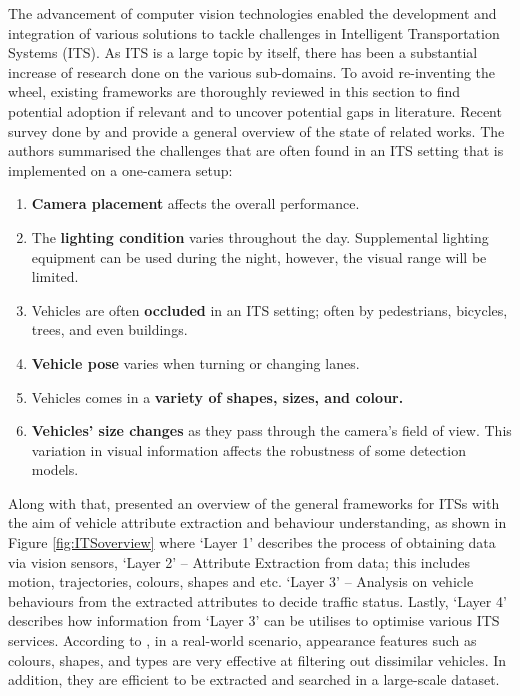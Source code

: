 The advancement of computer vision technologies enabled the development and
integration of various solutions to tackle challenges in Intelligent
Transportation Systems (ITS). As ITS is a large topic by itself, there has been a substantial increase of research done on the various sub-domains.
To avoid re-inventing the wheel, existing frameworks are thoroughly reviewed in this section to find potential adoption if relevant and to uncover potential gaps in literature. Recent survey done by  and
 provide a general overview of the state of related works. The authors summarised the challenges that are
often found in an ITS setting that is implemented on a one-camera setup:
\begin{enumerate}[label=(\alph*)]
 \item \textbf{Camera placement} affects the overall performance.
 \item The \textbf{lighting condition} varies throughout the day. Supplemental lighting equipment can be used during the night, however, the visual range will be limited.
  \item Vehicles are often \textbf{occluded} in an ITS setting; often by pedestrians, bicycles, trees, and even buildings.
 \item \textbf{Vehicle pose} varies when turning or changing lanes.
 \item Vehicles comes in a \textbf{variety of shapes, sizes, and colour.}
 \item \textbf{Vehicles' size changes} as they pass through the camera's field of view. This variation in visual information affects the robustness of some detection models.
\end{enumerate}
Along with that,  presented an overview of the
general frameworks for ITSs with the aim of vehicle attribute extraction and
behaviour understanding, as shown in Figure \ref{fig:ITSoverview} where `Layer 1' describes the process of obtaining data via vision sensors, `Layer 2' -- Attribute
Extraction from data; this includes motion, trajectories, colours, shapes
and etc. `Layer 3' -- Analysis on vehicle behaviours from the extracted
attributes to decide traffic status. Lastly, `Layer 4' describes how information from `Layer 3' can be utilises to optimise various ITS services. 
According to
, in a real-world scenario, appearance features such as
colours, shapes, and types are very effective at filtering out dissimilar
vehicles. In addition, they are efficient to be extracted and searched in a 
large-scale dataset. 

